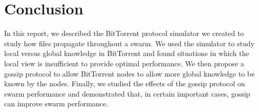 \section{Conclusion}

In this report, we described the BitTorrent protocol simulator we created to study how files 
propagate throughout a swarm. We used the simulator to study local versus global knowledge
in BitTorrent and found situations in which the local view is insufficient to provide 
optimal performance. We then propose a gossip protocol to allow BitTorrent nodes to
allow more global knowledge to be known by the nodes. Finally, we studied the effects
of the gossip protocol on swarm performance and demonstrated that, in certain important cases,
gossip can improve swarm performance.


